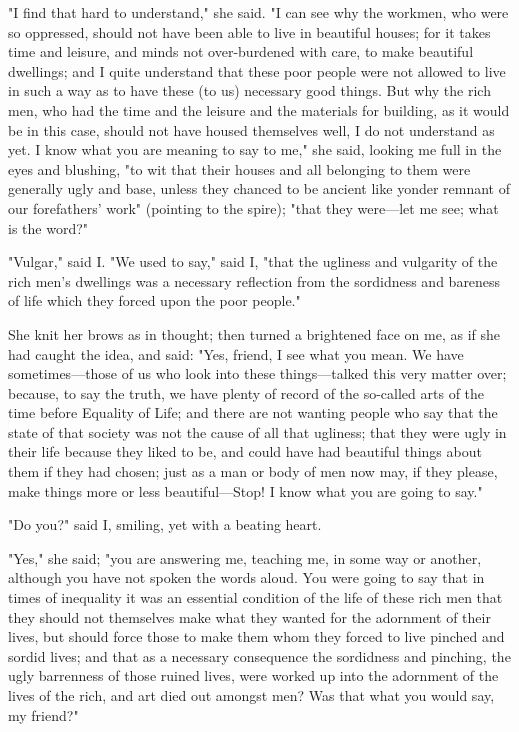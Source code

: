 "I find that hard to understand," she said. "I can see why the workmen,
who were so oppressed, should not have been able to live in beautiful
houses; for it takes time and leisure, and minds not over-burdened with
care, to make beautiful dwellings; and I quite understand that these
poor people were not allowed to live in such a way as to have these (to
us) necessary good things. But why the rich men, who had the time and
the leisure and the materials for building, as it would be in this case,
should not have housed themselves well, I do not understand as yet. I
know what you are meaning to say to me," she said, looking me full in
the eyes and blushing, "to wit that their houses and all belonging to
them were generally ugly and base, unless they chanced to be ancient
like yonder remnant of our forefathers' work" (pointing to the spire);
"that they were---let me see; what is the word?"

"Vulgar," said I. "We used to say," said I, "that the ugliness and
vulgarity of the rich men's dwellings was a necessary reflection from
the sordidness and bareness of life which they forced upon the poor
people."

She knit her brows as in thought; then turned a brightened face on me,
as if she had caught the idea, and said: "Yes, friend, I see what you
mean. We have sometimes---those of us who look into these
things---talked this very matter over; because, to say the truth, we
have plenty of record of the so-called arts of the time before Equality
of Life; and there are not wanting people who say that the state of that
society was not the cause of all that ugliness; that they were ugly in
their life because they liked to be, and could have had beautiful things
about them if they had chosen; just as a man or body of men now may, if
they please, make things more or less beautiful---Stop! I know what you
are going to say."

"Do you?" said I, smiling, yet with a beating heart.

"Yes," she said; "you are answering me, teaching me, in some way or
another, although you have not spoken the words aloud. You were going to
say that in times of inequality it was an essential condition of the
life of these rich men that they should not themselves make what they
wanted for the adornment of their lives, but should force those to make
them whom they forced to live pinched and sordid lives; and that as a
necessary consequence the sordidness and pinching, the ugly barrenness
of those ruined lives, were worked up into the adornment of the lives of
the rich, and art died out amongst men? Was that what you would say, my
friend?"

